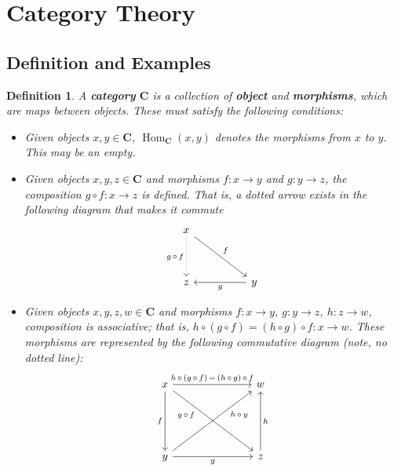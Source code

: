 \documentclass[12pt,reqno]{amsart}
\theoremstyle{plain}
\newtheorem{defi}{Definition}
\newcommand{\cat}{\mathbf{C}}
\DeclareMathOperator{\Hom}{Hom}
\begin{document}
\section{Category Theory}
\subsection{Definition and Examples}
\begin{defi} A \textbf{category} $\mathbf{C}$ is a collection of \textbf{object} and \textbf{morphisms}, which are maps between objects. These must satisfy the following conditions: 
\begin{itemize}
\item[\textup{(i)}] Given objects $x, y \in \cat$, $\Hom_{\cat} (x, y)$ denotes the morphisms from $x$ to $y$. This may be an empty. 
\item[\textup{(ii)}] Given objects $x, y, z \in \cat$ and morphisms $f \colon x \to y$ and $g \colon y \to z$, the composition $g \circ f \colon x \to z$ is defined. That is, a dotted arrow exists in the following diagram that makes it commute 
\[ 
\begin{tikzcd}
x \arrow[rrdd, "f"] \arrow[dd, "g \, \circ \, f"', dotted] &  &                   \\
                                             &  &                   \\
z                                            &  & y \arrow[ll, "g"]
\end{tikzcd}
\] 
\item[\textup{(iii)}] Given objects $x, y, z, w \in \cat$ and morphisms $f \colon x \to y$, $g \colon y \to z$, $h \colon z \to w$, composition is associative; that is, $h \circ ( g \circ f) = (h \circ g) \circ f \colon x \to w$. These morphisms are represented by the following commutative diagram (note, no dotted line): 
\[
\begin{tikzcd}
x \arrow[ddd, "f"'] \arrow[rrr, "h \, \circ \, ( g \, \circ \, f) \, = \, (h \, \circ \, g) \, \circ \, f"] \arrow[rrrddd, "\; \; \; \; \; \; h \, \circ \, y"] &  &  & w                   \\
                                                         &  &  &                     \\
                                                         &  &  &                     \\
y \arrow[rrr, "g"'] \arrow[rrruuu, "g \, \circ \, f \; \; \; \; \; \; "]                  &  &  & z \arrow[uuu, "h"']
\end{tikzcd}
\]
\end{itemize}
\end{defi}
\end{document}
